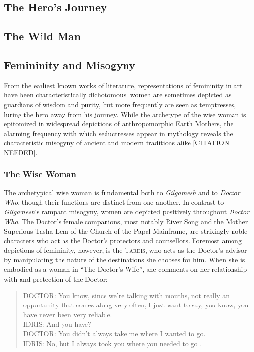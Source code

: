 \documentclass[10pt,a4paper]{article}
\begin{document}
\subsection{The Hero's Journey}
%
%

\subsection{The Wild Man}
%
%

\subsection{Femininity and Misogyny}
From the earliest known works of literature, representations of femininity in art have been characteristically dichotomous: women are sometimes depicted as guardians of wisdom and purity, but more frequently are seen as temptresses, luring the hero away from his journey. While the archetype of the wise woman is epitomized in widespread depictions of anthropomorphic Earth Mothers, the alarming frequency with which seductresses appear in mythology reveals the characteristic misogyny of ancient and modern traditions alike [CITATION NEEDED].

\subsubsection{The Wise Woman}
%
%
The archetypical wise woman is fundamental both to \emph{Gilgamesh} and to \emph{Doctor Who}, though their functions are distinct from one another. In contrast to \emph{Gilgamesh}’s rampant misogyny, women are depicted positively throughout \emph{Doctor Who}. The Doctor’s female companions, most notably River Song and the Mother Superious Tasha Lem of the Church of the Papal Mainframe, are strikingly noble characters who act as the Doctor’s protectors and counsellors. Foremost among depictions of femininity, however, is the \textsc{Tardis}, who acts as the Doctor’s advisor by manipulating the nature of the destinations she chooses for him. When she is embodied as a woman in “The Doctor’s Wife”, she comments on her relationship with and protection of the Doctor:
\begin{quote}DOCTOR: You know, since we're talking with mouths, not really an opportunity that comes along very often, I just want to say, you know, you have never been very reliable. 
\\ IDRIS: And you have? 
\\ DOCTOR: You didn't always take me where I wanted to go. 
\\ IDRIS: No, but I always took you where you needed to go \cite{TheDoctor'sWife}. \end{quote}
\end{document}
